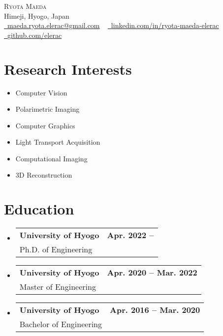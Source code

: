 \documentclass[letterpaper,11pt]{article}
\makeatletter
\newcommand{\resumeSubheading}[3]{
  \vspace{-2pt}\item
    \begin{tabular*}{1.0\textwidth}[t]{l@{\extracolsep{\fill}}r}
      \textbf{#1} & \textbf{\small #2} \\
      {\small#3} &  \\
    \end{tabular*}\vspace{-7pt}
}
\newcommand{\resumeSubHeadingListStart}{\begin{itemize}[leftmargin=0.0in, label={}]}
\newcommand{\resumeSubHeadingListEnd}{\end{itemize}}
\makeatother
\begin{document}

\begin{center}
    {\Huge \scshape Ryota Maeda} \\ \vspace{1pt}
    Himeji, Hyogo, Japan \\ \vspace{1pt}
    \small \href{mailto:maeda.ryota.elerac@gmail.com}{\raisebox{-0.2\height}\faEnvelope\  \underline{maeda.ryota.elerac@gmail.com}} ~ 
    \href{https://www.linkedin.com/in/ryota-maeda-elerac/}{\raisebox{-0.2\height}\faLinkedin\ \underline{linkedin.com/in/ryota-maeda-elerac}}  ~
    \href{https://github.com/elerac}{\raisebox{-0.2\height}\faGithub\ \underline{github.com/elerac}}
    \vspace{-8pt}
\end{center}

\section{Research Interests}
    \begin{multicols}{3}
        \begin{itemize}[itemsep=-5pt, parsep=3pt]
            \item\small Computer Vision
            \item Polarimetric Imaging
            \item Computer Graphics
            \item Light Transport Acquisition
            \item Computational Imaging
            \item 3D Reconstruction
        \end{itemize}
    \end{multicols}
    \vspace*{2.0\multicolsep}

\section{Education}
  \resumeSubHeadingListStart
    \resumeSubheading
      {University of Hyogo}{Apr. 2022 -- \phantom{Mar. 2025}}
      {Ph.D. of Engineering}
    \resumeSubheading
      {University of Hyogo}{Apr. 2020 -- Mar. 2022}
      {Master of Engineering}
    \resumeSubheading
      {University of Hyogo}{Apr. 2016 -- Mar. 2020}
      {Bachelor of Engineering}
  \resumeSubHeadingListEnd
\end{document}
